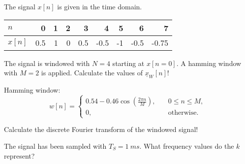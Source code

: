 \begin{question}[subtitle={Sampling Non-Periodic Signals}]
	The signal $x[n]$ is given in the time domain.
	\begin{table}[H]
		\centering
		\begin{tabular}{|l|r|r|r|r|r|r|r|r|}
			\hline
			$n$ & 0 & 1 & 2 & 3 & 4 & 5 & 6 & 7 \\
			\hline
			\hline
			$x[n]$ & 0.5 & 1 & 0 & 0.5 & -0.5 & -1 & -0.5 & -0.75 \\
			\hline
		\end{tabular}
	\end{table}
	
	\begin{tasks}
		\task
		The signal is windowed with $N = 4$ starting at $x[n = 0]$. A hamming window with $M = 2$ is applied. Calculate the values of $\underline{x}_W[n]$!
		
		Hamming window:
		\begin{equation*}
			w[n] = \begin{cases}0.54 - 0.46 \cos\left(\frac{2 \pi n}{M}\right), &\quad 0 \leq n \leq M,\\ 0, &\quad \text{otherwise}.\end{cases}
		\end{equation*}
		
		\task
		Calculate the discrete Fourier transform of the windowed signal!
		
		\task
		The signal has been sampled with $T_S = \SI{1}{ms}$. What frequency values do the $k$ represent?
	\end{tasks}
\end{question}

